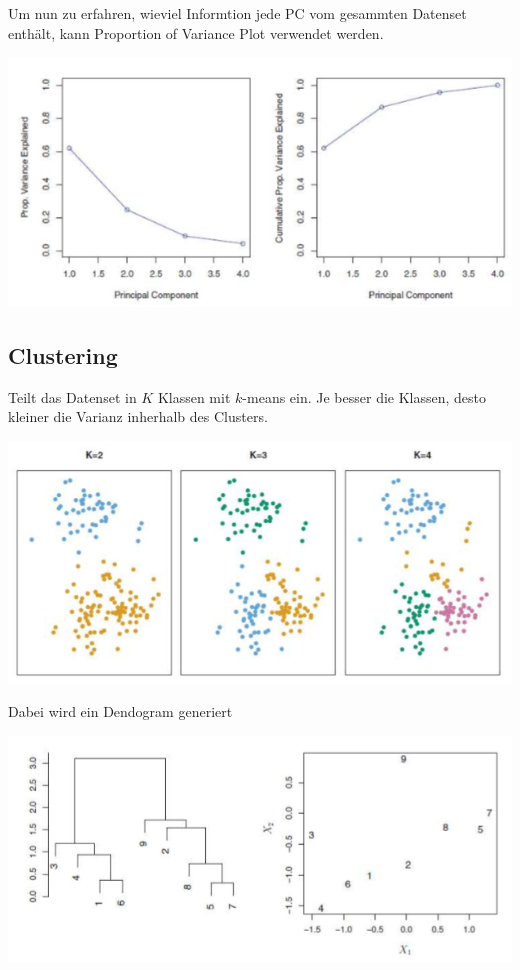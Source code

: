 Um nun zu erfahren, wieviel Informtion jede PC vom gesammten Datenset enthält, kann Proportion of Variance Plot verwendet werden.

\begin{center}
	\includegraphics[width=\columnwidth]{Images/pc3}
\end{center}


\subsection{Clustering}
Teilt das Datenset in $K$ Klassen mit $k$-means ein. Je besser die Klassen, desto kleiner die Varianz inherhalb des Clusters. 
\begin{center}
	\includegraphics[width=0.5\columnwidth]{Images/clustering}
\end{center}

Dabei wird ein Dendogram generiert
\begin{center}
	\includegraphics[width=\columnwidth]{Images/dendogram}
\end{center}

